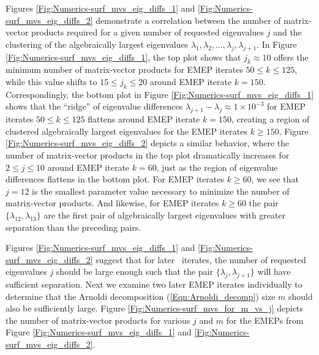 Figures \ref{Fig:Numerics-surf_mvs_eig_diffs_1} and \ref{Fig:Numerics-surf_mvs_eig_diffs_2} demonstrate a correlation between the number of matrix-vector products required for a given number of requested eigenvalues $j$ and the clustering of the algebraically largest eigenvalues $\lambda_1, \lambda_2, \ldots, \lambda_j, \lambda_{j+1}$.
In Figure \ref{Fig:Numerics-surf_mvs_eig_diffs_1}, the top plot shows that $j_k \approx 10$ offers the minimum number of matrix-vector products for EMEP iterates $50 \leq k  \leq 125$, while this value shifts to $15 \leq j_k \leq 20$ around EMEP iterate $k = 150$.
Correspondingly, the bottom plot in Figure \ref{Fig:Numerics-surf_mvs_eig_diffs_1} shows that the ``ridge'' of eigenvalue differences $\lambda_{j+1} - \lambda_j \approx 1 \times 10^{-3}$ for EMEP iterates $50 \leq k  \leq 125$ flattens around EMEP iterate $k = 150$, creating a region of clustered algebraically largest eigenvalues for the EMEP iterates $k \geq 150$.
Figure \ref{Fig:Numerics-surf_mvs_eig_diffs_2} depicts a similar behavior, where the number of matrix-vector products in the top plot dramatically increases for $2 \leq j  \leq 10$ around EMEP iterate $k = 60$, just as the region of eigenvalue differences flattens in the bottom plot.
For EMEP iterates $k \geq 60$, we see that $j = 12$ is the smallest parameter value necessary to minimize the number of matrix-vector products.
And likewise, for EMEP iterates $k \geq 60$ the pair $\{ \lambda_{12}, \lambda_{13} \}$ are the first pair of algebraically largest eigenvalues with greater separation than the preceding pairs.




Figures \ref{Fig:Numerics-surf_mvs_eig_diffs_1} and \ref{Fig:Numerics-surf_mvs_eig_diffs_2} suggest that for later \emep \ iterates, the number of requested eigenvalues $j$ should be large enough such that the pair $\{ \lambda_j,  \lambda_{j+1} \}$ will have sufficient separation.
Next we examine two later EMEP iterates individually to determine that the Arnoldi decomposition (\ref{Eqn:Arnoldi_decomp}) size $m$ should also be sufficiently large.
Figure \ref{Fig:Numerics-surf_mvs_for_m_vs_j} depicts the number of matrix-vector products for various $j$ and $m$ for the EMEPs from Figure \ref{Fig:Numerics-surf_mvs_eig_diffs_1} and \ref{Fig:Numerics-surf_mvs_eig_diffs_2}.


